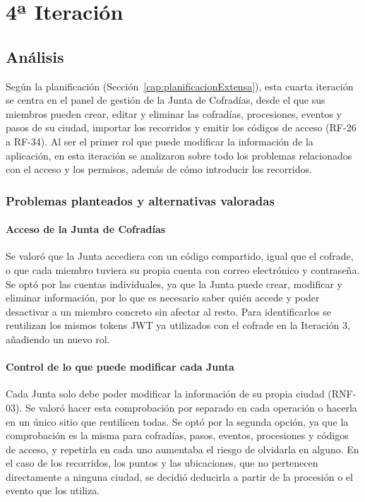 \section{4ª Iteración}\label{cap:4_iteracion}

\subsection{Análisis}

Según la planificación (Sección~\ref{cap:planificacionExtensa}), esta cuarta iteración se centra en el panel de gestión de la Junta de Cofradías, desde el que sus miembros pueden crear, editar y eliminar las cofradías, procesiones, eventos y pasos de su ciudad, importar los recorridos y emitir los códigos de acceso (RF-26 a RF-34). Al ser el primer rol que puede modificar la información de la aplicación, en esta iteración se analizaron sobre todo los problemas relacionados con el acceso y los permisos, además de cómo introducir los recorridos.

\subsubsection{Problemas planteados y alternativas valoradas}

\paragraph{Acceso de la Junta de Cofradías}
Se valoró que la Junta accediera con un código compartido, igual que el cofrade, o que cada miembro tuviera su propia cuenta con correo electrónico y contraseña. Se optó por las cuentas individuales, ya que la Junta puede crear, modificar y eliminar información, por lo que es necesario saber quién accede y poder desactivar a un miembro concreto sin afectar al resto. Para identificarlos se reutilizan los mismos tokens JWT ya utilizados con el cofrade en la Iteración 3, añadiendo un nuevo rol.

\paragraph{Control de lo que puede modificar cada Junta}
Cada Junta solo debe poder modificar la información de su propia ciudad (RNF-03). Se valoró hacer esta comprobación por separado en cada operación o hacerla en un único sitio que reutilicen todas. Se optó por la segunda opción, ya que la comprobación es la misma para cofradías, pasos, eventos, procesiones y códigos de acceso, y repetirla en cada uno aumentaba el riesgo de olvidarla en alguno. En el caso de los recorridos, los puntos y las ubicaciones, que no pertenecen directamente a ninguna ciudad, se decidió deducirla a partir de la procesión o el evento que los utiliza.

